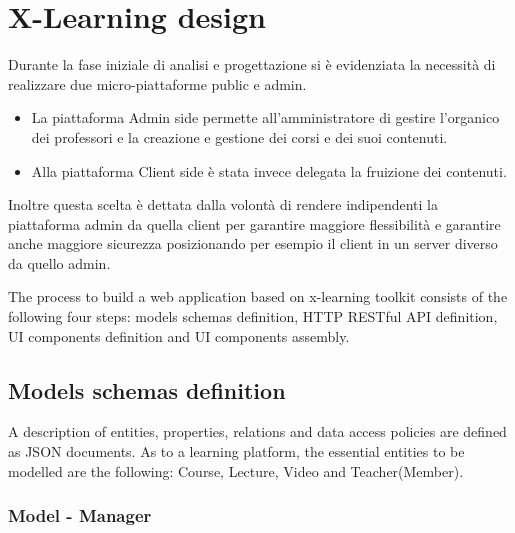 \section{X-Learning design}
\label{sec:x-learning_design}

Durante la fase iniziale di analisi e progettazione si è evidenziata la necessità di realizzare due micro-piattaforme public e admin. 
\begin{itemize}
\item La piattaforma Admin side permette all'amministratore di gestire l'organico dei professori e la creazione e gestione dei corsi e dei suoi contenuti.
\item Alla piattaforma Client side è stata invece delegata la fruizione dei contenuti.
\end{itemize}
Inoltre questa scelta è dettata dalla volontà di rendere indipendenti la piattaforma admin da quella client per garantire maggiore flessibilità e garantire anche maggiore sicurezza posizionando per esempio il client in un server diverso da quello admin.




The process to build a web application based on x-learning toolkit consists of the following four steps: models schemas definition, HTTP RESTful API definition, UI components definition and UI components  assembly.


\subsection {Models schemas definition}
\label{subsec:models_schemas_definitio}


A description of entities, properties, relations and data access policies are defined as JSON  documents.
As to a learning platform, the essential entities to be modelled are the following: Course, Lecture, Video and Teacher(Member).


\subsubsection{ Model - Manager}

